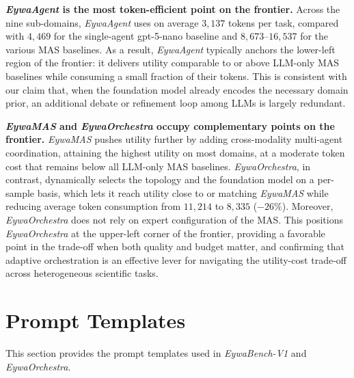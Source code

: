 \textbf{\textit{EywaAgent} is the most token-efficient point on the frontier.} Across the nine sub-domains, \textit{EywaAgent} uses on average $3{,}137$ tokens per task, compared with $4{,}469$ for the single-agent gpt-5-nano baseline and $8{,}673$--$16{,}537$ for the various MAS baselines. As a result, \textit{EywaAgent} typically anchors the lower-left region of the frontier: it delivers utility comparable to or above LLM-only MAS baselines while consuming a small fraction of their tokens. This is consistent with our claim that, when the foundation model already encodes the necessary domain prior, an additional debate or refinement loop among LLMs is largely redundant.
 
\textbf{\textit{EywaMAS} and \textit{EywaOrchestra} occupy complementary points on the frontier.} \textit{EywaMAS} pushes utility further by adding cross-modality multi-agent coordination, attaining the highest utility on most domains, at a moderate token cost that remains below all LLM-only MAS baselines. \textit{EywaOrchestra}, in contrast, dynamically selects the topology and the foundation model on a per-sample basis, which lets it reach utility close to or matching \textit{EywaMAS} while reducing average token consumption from $11{,}214$ to $8{,}335$ ($-26\%$). Moreover, \textit{EywaOrchestra} does not rely on expert configuration of the MAS. This positions \textit{EywaOrchestra} at the upper-left corner of the frontier, providing a favorable point in the trade-off when both quality and budget matter, and confirming that adaptive orchestration is an effective lever for navigating the utility-cost trade-off across heterogeneous scientific tasks.





\section{Prompt Templates}
\label{app:prompts}

This section provides the prompt templates used in \textit{EywaBench-V1} and \textit{EywaOrchestra}. 

